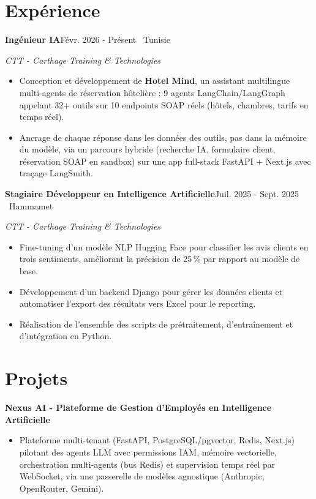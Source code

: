 \documentclass[11pt,a4paper]{article}
\newcommand{\entry}[2]{\textbf{#1}\hfill{\small\color{muted}#2}\par}
\newcommand{\org}[1]{{\itshape\color{muted}#1}\par}
\newcommand{\proj}[1]{\textbf{#1}\par}
\begin{document}
\section{Expérience}
\entry{Ingénieur IA}{Févr. 2026 - Présent \textperiodcentered\ Tunisie}
\org{CTT - Carthage Training \& Technologies}
\begin{itemize}
  \item Conception et développement de \textbf{Hotel Mind}, un assistant multilingue multi-agents de réservation hôtelière : 9 agents LangChain/LangGraph appelant 32+ outils sur 10 endpoints SOAP réels (hôtels, chambres, tarifs en temps réel).
  \item Ancrage de chaque réponse dans les données des outils, pas dans la mémoire du modèle, via un parcours hybride (recherche IA, formulaire client, réservation SOAP en sandbox) sur une app full-stack FastAPI + Next.js avec traçage LangSmith.
\end{itemize}
\vspace{2pt}
\entry{Stagiaire Développeur en Intelligence Artificielle}{Juil. 2025 - Sept. 2025 \textperiodcentered\ Hammamet}
\org{CTT - Carthage Training \& Technologies}
\begin{itemize}
  \item Fine-tuning d'un modèle NLP Hugging Face pour classifier les avis clients en trois sentiments, améliorant la précision de 25\,\% par rapport au modèle de base.
  \item Développement d'un backend Django pour gérer les données clients et automatiser l'export des résultats vers Excel pour le reporting.
  \item Réalisation de l'ensemble des scripts de prétraitement, d'entraînement et d'intégration en Python.
\end{itemize}

\section{Projets}

\proj{Nexus AI - Plateforme de Gestion d'Employés en Intelligence Artificielle}
\begin{itemize}
  \item Plateforme multi-tenant (FastAPI, PostgreSQL/pgvector, Redis, Next.js) pilotant des agents LLM avec
        permissions IAM, mémoire vectorielle, orchestration multi-agents (bus Redis) et supervision temps réel
        par WebSocket, via une passerelle de modèles agnostique (Anthropic, OpenRouter, Gemini).
\end{itemize}
\end{document}
